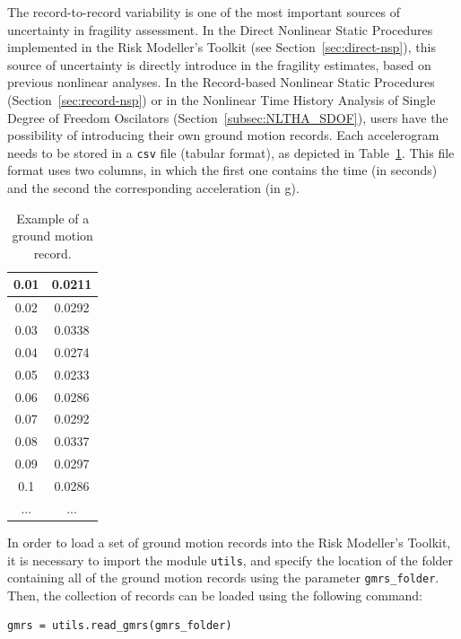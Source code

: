 The record-to-record variability is one of the most important sources of uncertainty in fragility assessment. In the Direct Nonlinear Static Procedures implemented in the Risk Modeller's Toolkit (see Section~\ref{sec:direct-nsp}), this source of uncertainty is directly introduce in the fragility estimates, based on previous nonlinear analyses. In the Record-based Nonlinear Static Procedures (Section~\ref{sec:record-nsp}) or in the Nonlinear Time History Analysis of Single Degree of Freedom Oscilators (Section~\ref{subsec:NLTHA_SDOF}), users have the possibility of introducing their own ground motion records. Each accelerogram needs to be stored in a \verb=csv= file (tabular format), as depicted in Table~\ref{table:gmr}. This file format uses two columns, in which the first one contains the time (in seconds) and the second the corresponding acceleration (in g).\\

\begin {table}[htb]
\caption{Example of a ground motion record.}
\label{table:gmr}
\begin{center}
  \begin{tabular}{ | c | c |}
  \hline
0.01 & 0.0211 \\ \hline
0.02 & 0.0292 \\ \hline
0.03 & 0.0338 \\ \hline
0.04 & 0.0274 \\ \hline
0.05 & 0.0233 \\ \hline
0.06 & 0.0286 \\ \hline
0.07 & 0.0292 \\ \hline
0.08 & 0.0337 \\ \hline
0.09 & 0.0297 \\ \hline
0.1 & 0.0286 \\ \hline
... & ...  \\ \hline
  \end{tabular}
\end{center}
\end{table}

In order to load a set of ground motion records into the Risk Modeller's Toolkit, it is necessary to import the module \verb=utils=, and specify the location of the folder containing all of the ground motion records using the parameter \verb=gmrs_folder=. Then, the collection of records can be loaded using the following command:

\begin{Verbatim}[frame=single, commandchars=\\\{\}, samepage=true]
gmrs = utils.read_gmrs(gmrs_folder)
\end{Verbatim}

